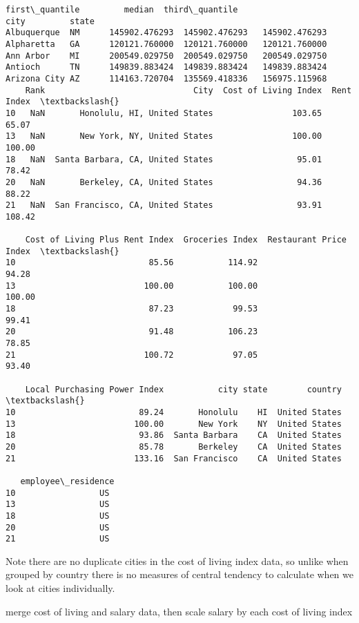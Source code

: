 \documentclass[11pt]{article}
\begin{document}
    \begin{Verbatim}[commandchars=\\\{\}]
                    first\_quantile         median  third\_quantile
city         state
Albuquerque  NM      145902.476293  145902.476293   145902.476293
Alpharetta   GA      120121.760000  120121.760000   120121.760000
Ann Arbor    MI      200549.029750  200549.029750   200549.029750
Antioch      TN      149839.883424  149839.883424   149839.883424
Arizona City AZ      114163.720704  135569.418336   156975.115968
    Rank                              City  Cost of Living Index  Rent Index  \textbackslash{}
10   NaN       Honolulu, HI, United States                103.65       65.07
13   NaN       New York, NY, United States                100.00      100.00
18   NaN  Santa Barbara, CA, United States                 95.01       78.42
20   NaN       Berkeley, CA, United States                 94.36       88.22
21   NaN  San Francisco, CA, United States                 93.91      108.42

    Cost of Living Plus Rent Index  Groceries Index  Restaurant Price Index  \textbackslash{}
10                           85.56           114.92                   94.28
13                          100.00           100.00                  100.00
18                           87.23            99.53                   99.41
20                           91.48           106.23                   78.85
21                          100.72            97.05                   93.40

    Local Purchasing Power Index           city state        country  \textbackslash{}
10                         89.24       Honolulu    HI  United States
13                        100.00       New York    NY  United States
18                         93.86  Santa Barbara    CA  United States
20                         85.78       Berkeley    CA  United States
21                        133.16  San Francisco    CA  United States

   employee\_residence
10                 US
13                 US
18                 US
20                 US
21                 US
    \end{Verbatim}

    Note there are no duplicate cities in the cost of living index data, so
unlike when grouped by country there is no measures of central tendency
to calculate when we look at cities individually.

merge cost of living and salary data, then scale salary by each cost of
living index
\end{document}
